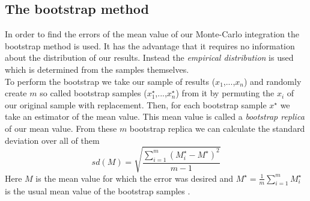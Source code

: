 
\subsection{The bootstrap method}
In order to find the errors of the mean value of our Monte-Carlo integration the bootstrap method is used. It has the advantage that it requires no information about the distribution of our results. Instead the \textit{empirical distribution} is used which is determined from the samples themselves. \\
To perform the bootstrap we take our sample of results ($x_1$,...,$x_n$) and randomly create $m$ so called bootstrap samples ($x^{\star}_1$,...,$x^{\star}_n$) from it by permuting the $x_i$ of our original sample with replacement. Then, for each bootstrap sample $x^{\star}$ we take an estimator of the mean value. This mean value is called a \textit{bootstrap replica} of our mean value. From these $m$ bootstrap replica we can calculate the standard deviation over all of them
\begin{equation}
	sd(M)=\sqrt{\frac{\sum_{i=1}^{m}(M^{\star}_i-M^{\star})^2}{m-1}} \label{bootstraperror}
\end{equation}  
Here $M$ is the mean value for which the error was desired and $M^{\star}=\frac{1}{m}\sum_{i=1}^{m}M^{\star}_i$ is the usual mean value of the bootstrap samples \cite{computational}.
	